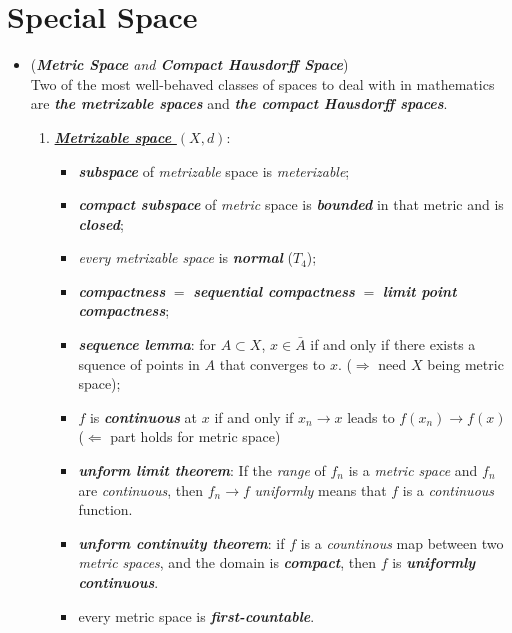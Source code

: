 \documentclass[11pt]{article}
\begin{document}
\section{Special Space}
\begin{itemize}
\item \begin{remark} (\emph{\textbf{Metric Space} and \textbf{Compact Hausdorff Space}})\\
Two of the most well-behaved classes of spaces to deal with in mathematics are \emph{\textbf{the metrizable spaces}} and \emph{\textbf{the compact Hausdorff spaces}}. 
\begin{enumerate}
\item \underline{\emph{\textbf{Metrizable space $(X ,d)$}}}: 
\begin{itemize}
\item \emph{\textbf{subspace}} of \emph{metrizable} space is \emph{meterizable};
\item \emph{\textbf{compact subspace}} of \emph{metric} space is \emph{\textbf{bounded}} in that metric and is \emph{\textbf{closed}};
\item \emph{every metrizable space} is \emph{\textbf{normal}} ($T_4$);
\item \emph{\textbf{compactness}} $=$ \emph{\textbf{sequential compactness}} $=$ \emph{\textbf{limit point compactness}};
\item \emph{\textbf{sequence lemma}}: for $A \subset X$,  $x \in \bar{A}$ if and only if  there exists a squence of points in $A$ that converges to $x$.  ($\Rightarrow$ need $X$ being metric space);
\item $f$ is \emph{\textbf{continuous}} at $x$ if and only if $x_n \rightarrow x$ leads to $f(x_n) \rightarrow f(x)$ ($\Leftarrow$ part holds for metric space)
\item \emph{\textbf{unform limit theorem}}: If the \emph{range} of $f_n$ is a \emph{metric space} and $f_n$ are \emph{continuous}, then $f_n \rightarrow f$ \emph{uniformly} means that $f$ is a \emph{continuous} function. 
\item \emph{\textbf{unform continuity theorem}}: if $f$ is a \emph{countinous} map between two \emph{metric spaces}, and the domain is \emph{\textbf{compact}}, then $f$ is \emph{\textbf{uniformly continuous}}.
\item every metric space is \emph{\textbf{first-countable}}.
\end{itemize}


\end{enumerate}
\end{remark}
\end{itemize}
\end{document}
